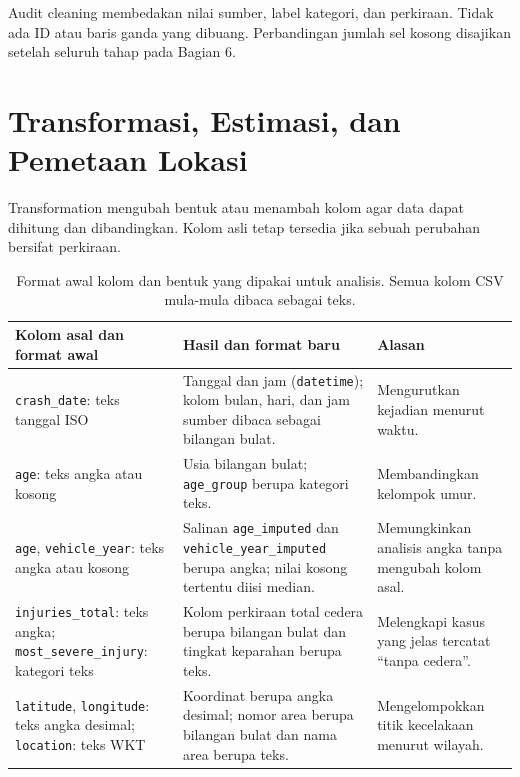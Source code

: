 \documentclass[10pt,a4paper]{article}
\begin{document}
Audit cleaning membedakan nilai sumber, label kategori, dan perkiraan.
Tidak ada ID atau baris ganda yang dibuang. Perbandingan jumlah sel kosong
disajikan setelah seluruh tahap pada Bagian 6.

\section{Transformasi, Estimasi, dan Pemetaan Lokasi}

Transformation mengubah bentuk atau menambah kolom agar data dapat dihitung
dan dibandingkan. Kolom asli tetap tersedia jika sebuah perubahan bersifat
perkiraan.

\begin{table}[H]
\centering\footnotesize
\caption{Format awal kolom dan bentuk yang dipakai untuk analisis. Semua kolom CSV mula-mula dibaca sebagai teks.}
\begin{tabularx}{\linewidth}{p{3.3cm}
>{\raggedright\arraybackslash}X
>{\raggedright\arraybackslash}X}
\toprule
Kolom asal dan format awal & Hasil dan format baru & Alasan\\
\midrule
\texttt{crash\_date}: teks tanggal ISO & Tanggal dan jam (\texttt{datetime}); kolom bulan, hari, dan jam sumber dibaca sebagai bilangan bulat. & Mengurutkan kejadian menurut waktu.\\
\texttt{age}: teks angka atau kosong & Usia bilangan bulat; \texttt{age\_group} berupa kategori teks. & Membandingkan kelompok umur.\\
\texttt{age}, \texttt{vehicle\_year}: teks angka atau kosong & Salinan \texttt{age\_imputed} dan \texttt{vehicle\_year\_imputed} berupa angka; nilai kosong tertentu diisi median. & Memungkinkan analisis angka tanpa mengubah kolom asal.\\
\texttt{injuries\_total}: teks angka; \texttt{most\_severe\_injury}: kategori teks & Kolom perkiraan total cedera berupa bilangan bulat dan tingkat keparahan berupa teks. & Melengkapi kasus yang jelas tercatat ``tanpa cedera''.\\
\texttt{latitude}, \texttt{longitude}: teks angka desimal; \texttt{location}: teks WKT & Koordinat berupa angka desimal; nomor area berupa bilangan bulat dan nama area berupa teks. & Mengelompokkan titik kecelakaan menurut wilayah.\\
\bottomrule
\end{tabularx}
\end{table}
\end{document}
